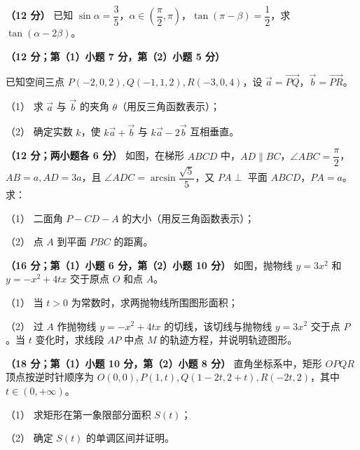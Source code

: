 \begin{question}
\textbf{（12 分）} 已知 \(\sin\alpha=\dfrac35\)，\(\alpha\in(\dfrac\pi2,\pi)\)，\(\tan(\pi-\beta)=\dfrac12\)，求 \(\tan(\alpha-2\beta)\)。

\end{question}
\begin{question}
\textbf{（12 分；第（1）小题 7 分，第（2）小题 5 分）}

已知空间三点 \(P(-2,0,2),Q(-1,1,2),R(-3,0,4)\)，设 \(\vec a=\overrightarrow{PQ}\)，\(\vec b=\overrightarrow{PR}\)。

（1） 求 \(\vec a\) 与 \(\vec b\) 的夹角 \(\theta\)（用反三角函数表示）；

（2） 确定实数 \(k\)，使 \(k\vec a+\vec b\) 与 \(k\vec a-2\vec b\) 互相垂直。

\Needspace{0.4\textheight}
\end{question}
\begin{question}
\textbf{（12 分；两小题各 6 分）} 如图，在梯形 \(ABCD\) 中，\(AD\parallel BC\)，\(\angle ABC=\dfrac\pi2\)，\(AB=a,AD=3a\)，且 \(\angle ADC=\arcsin\dfrac{\sqrt5}{5}\)，又 \(PA\perp\) 平面 \(ABCD\)，\(PA=a\)。求：

（1） 二面角 \(P-CD-A\) 的大小（用反三角函数表示）；

（2） 点 \(A\) 到平面 \(PBC\) 的距离。
\nopagebreak[4]
\begin{center}\end{center}
\nopagebreak[4]
\Needspace{0.4\textheight}
\end{question}
\begin{question}
\textbf{（16 分；第（1）小题 6 分，第（2）小题 10 分）} 如图，抛物线 \(y=3x^2\) 和 \(y=-x^2+4tx\) 交于原点 \(O\) 和点 \(A\)。

（1） 当 \(t>0\) 为常数时，求两抛物线所围图形面积；

（2） 过 \(A\) 作抛物线 \(y=-x^2+4tx\) 的切线，该切线与抛物线 \(y=3x^2\) 交于点 \(P\)。当 \(t\) 变化时，求线段 \(AP\) 中点 \(M\) 的轨迹方程，并说明轨迹图形。
\nopagebreak[4]
\begin{center}\end{center}
\nopagebreak[4]
\end{question}
\begin{question}
\textbf{（18 分；第（1）小题 10 分，第（2）小题 8 分）} 直角坐标系中，矩形 \(OPQR\) 顶点按逆时针顺序为 \(O(0,0),P(1,t),\mathord{Q(1-2t,2+t)},R(-2t,2)\)，其中 \(t\in(0,+\infty)\)。

（1） 求矩形在第一象限部分面积 \(S(t)\)；

（2） 确定 \(S(t)\) 的单调区间并证明。

\end{question}
